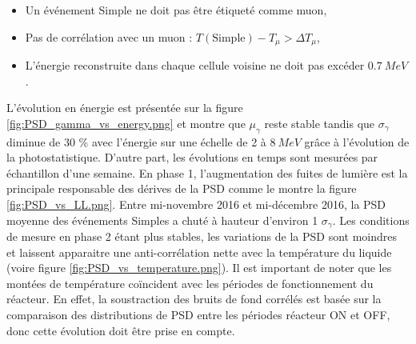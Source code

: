 \begin{itemize}[label=\textbullet]
    \item Un événement Simple ne doit pas être étiqueté comme muon,
    \item Pas de corrélation avec un muon : $T(\textrm{Simple}) - T_\mu > \Delta T_\mu$,
    \item L'énergie reconstruite dans chaque cellule voisine ne doit pas excéder $\SI{0.7}{MeV}$.
\end{itemize}

\bigbreak

L'évolution en énergie est présentée sur la figure \ref{fig:PSD_gamma_vs_energy.png} et montre que $\mu_\gamma$ reste stable tandis que $\sigma_\gamma$ diminue de 30 \% avec l'énergie sur une échelle de 2 à $\SI{8}{MeV}$ grâce à l'évolution de la photostatistique. D'autre part, les évolutions en temps sont mesurées par échantillon d'une semaine. En phase 1, l'augmentation des fuites de lumière est la principale responsable des dérives de la PSD comme le montre la figure \ref{fig:PSD_vs_LL.png}. Entre mi-novembre 2016 et mi-décembre 2016, la PSD moyenne des événements Simples a chuté à hauteur d'environ 1 $\sigma_\gamma$. Les conditions de mesure en phase 2 étant plus stables, les variations de la PSD sont moindres et laissent apparaitre une anti-corrélation nette avec la température du liquide (voire figure \ref{fig:PSD_vs_temperature.png}). Il est important de noter que les montées de température coïncident avec les périodes de fonctionnement du réacteur. En effet, la soustraction des bruits de fond corrélés est basée sur la comparaison des distributions de PSD entre les périodes réacteur ON et OFF, donc cette évolution doit être prise en compte.\\

